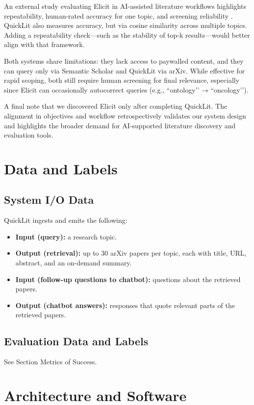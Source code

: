\documentclass{article}
\begin{document}
An external study evaluating Elicit in AI-assisted literature workflows highlights repeatability, human-rated accuracy for one topic, and screening reliability \cite{bernard2025elicit}. QuickLit also measures accuracy, but via cosine similarity across multiple topics. Adding a repeatability check—such as the stability of top-k results—would better align with that framework.

Both systems share limitations: they lack access to paywalled content, and they can query only via Semantic Scholar and QuickLit via arXiv. While effective for rapid scoping, both still require human screening for final relevance, especially since Elicit can occasionally autocorrect queries (e.g., “ontology’’ → “oncology’’). 

A final note that we discovered Elicit only after completing QuickLit. The alignment in objectives and workflow retrospectively validates our system design and highlights the broader demand for AI-supported literature discovery and evaluation tools.


\section{Data and Labels}
\subsection{System I/O Data}
QuickLit ingests and emits the following:
\begin{itemize}
\item \textbf{Input (query):} a research topic.
\item \textbf{Output (retrieval):} up to 30 arXiv papers per topic, each with title, URL, abstract, and an on-demand summary.
\item \textbf{Input (follow-up questions to chatbot):} questions about the retrieved papers.
\item \textbf{Output (chatbot answers):} responses that quote relevant parts of the retrieved papers.
\end{itemize}

\subsection{Evaluation Data and Labels}
See Section Metrics of Success.
\section{Architecture and Software}
\end{document}

